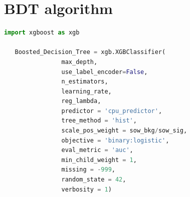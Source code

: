 \documentclass[12pt, a4paper]{book}
\begin{document}
\clearpage
\section{BDT algorithm}
\begin{lstlisting}[language=Python, caption={Boosted Decision Tree definition using XGBoost}, label=alg:xgb, captionpos=t]
   import xgboost as xgb
   
   Boosted_Decision_Tree = xgb.XGBClassifier(
                max_depth, 
                use_label_encoder=False,
                n_estimators,
                learning_rate,
                reg_lambda,
                predictor = 'cpu_predictor',
                tree_method = 'hist',
                scale_pos_weight = sow_bkg/sow_sig,
                objective = 'binary:logistic',
                eval_metric = 'auc',
                min_child_weight = 1,
                missing = -999,
                random_state = 42,
                verbosity = 1) 
\end{lstlisting}
\end{document}
